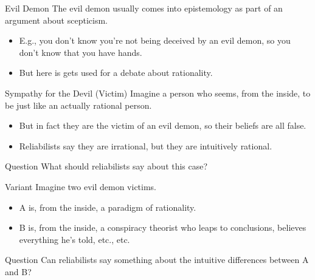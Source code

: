 \documentclass[
  17pt,
  letterpaper,
  ignorenonframetext,
  aspectratio=169,
]{beamer}
\providecommand{\tightlist}{%
  \setlength{\itemsep}{0pt}\setlength{\parskip}{0pt}}\usepackage{longtable,booktabs,array}
\begin{document}
\begin{frame}{Evil Demon}
\protect\hypertarget{evil-demon}{}
The evil demon usually comes into epistemology as part of an argument
about scepticism.

\begin{itemize}[<+->]
\tightlist
\item
  E.g., you don't know you're not being deceived by an evil demon, so
  you don't know that you have hands.
\item
  But here is gets used for a debate about rationality.
\end{itemize}
\end{frame}

\begin{frame}{Sympathy for the Devil (Victim)}
\protect\hypertarget{sympathy-for-the-devil-victim}{}
Imagine a person who seems, from the inside, to be just like an actually
rational person.

\begin{itemize}[<+->]
\tightlist
\item
  But in fact they are the victim of an evil demon, so their beliefs are
  all false.
\item
  Reliabilists say they are irrational, but they are intuitively
  rational.
\end{itemize}
\end{frame}

\begin{frame}{Question}
\protect\hypertarget{question-1}{}
What should reliabilists say about this case?
\end{frame}

\begin{frame}{Variant}
\protect\hypertarget{variant}{}
Imagine two evil demon victims.

\begin{itemize}[<+->]
\tightlist
\item
  A is, from the inside, a paradigm of rationality.
\item
  B is, from the inside, a conspiracy theorist who leaps to conclusions,
  believes everything he's told, etc., etc.
\end{itemize}
\end{frame}

\begin{frame}{Question}
\protect\hypertarget{question-2}{}
Can reliabilists say something about the intuitive differences between A
and B?
\end{frame}
\end{document}
